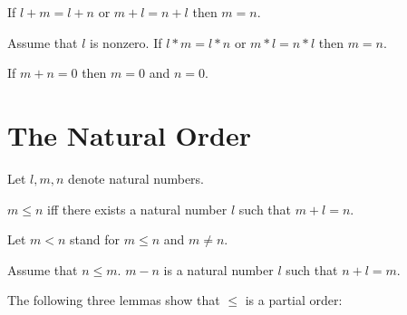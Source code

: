 \documentclass[11pt]{article}
\begin{document}
\begin{forthel}
\begin{axiom}
If $l + m = l + n$ or $m + l = n + l$ then $m = n$.
\end{axiom}

\begin{axiom}
Assume that $l$ is nonzero.
If $l * m = l * n$ or $m * l = n * l$ then $m = n$.
\end{axiom}

\begin{axiom}
If $m + n = 0$ then $m = 0$ and $n = 0$.
\end{axiom}

\end{forthel}


\section{The Natural Order}

\begin{forthel}
Let $l,m,n$ denote natural numbers.

\begin{definition}
$m \leq n$ iff
there exists a natural number $l$ such that $m + l = n$.
\end{definition}

Let $m < n$ stand for $m \leq n$ and $m \neq n$.

\begin{definition}
Assume that $n \leq m$.
$m - n$ is a natural number $l$ such that $n + l  = m$.
\end{definition}

\end{forthel}

The following three lemmas show that $\leq$ is a partial order:
\end{document}
